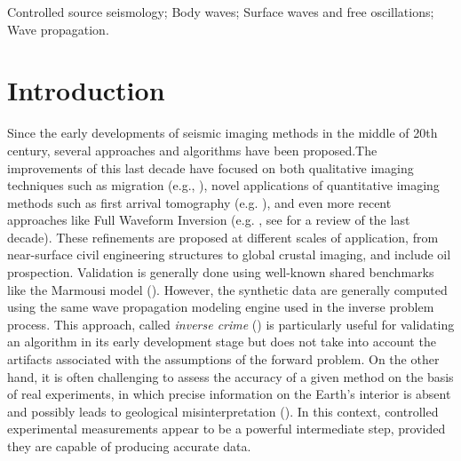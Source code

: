 \documentclass[extra,mreferee]{gji}
\begin{document}
\begin{keywords}
Controlled source seismology; Body waves; Surface waves and free oscillations; Wave propagation.
\end{keywords}

\section{Introduction}


Since the early developments of seismic imaging methods in the middle of 20th century, several approaches and algorithms have been proposed.The improvements of this last decade have focused on both qualitative imaging techniques such as migration (e.g., \cite{Berkhout_MSS_2012,Guofeng_GPU_2013}), novel applications of quantitative imaging methods such as first arrival tomography (e.g. \cite{Bohm_CWS_2015}), and even more recent approaches like Full Waveform Inversion (e.g. \cite{Perez_AWI_2014}, see \cite{Virieux_FWI_2009} for a review of the last decade). These refinements are proposed at different scales of application, from near-surface civil engineering structures to global crustal imaging, and include oil prospection. Validation is generally done using well-known shared benchmarks like the Marmousi model (\cite{martin2006marmousi2}). However, the synthetic data are generally computed using the same wave propagation modeling engine used in the inverse problem process. This approach, called \textit{inverse crime} (\cite{Wirgin_TIC_2004}) is particularly useful for validating an algorithm in its early development stage but does not take into account the artifacts associated with the assumptions of the forward problem. On the other hand, it is often challenging to assess the accuracy of a given method on the basis of real experiments, in which precise information on the Earth's interior is absent and possibly leads to geological misinterpretation (\cite{Morozov_ARF_2004}). In this context, controlled experimental measurements appear to be a powerful intermediate step, provided they are capable of producing accurate data.
\end{document}
